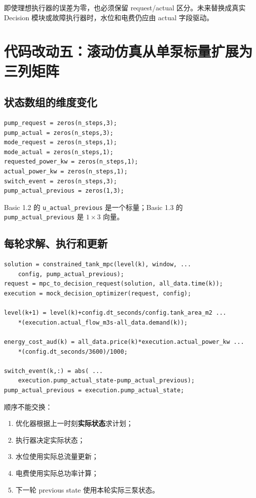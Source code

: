 \documentclass[UTF8,a4paper,11pt]{ctexart}
\newcommand{\code}[1]{\texttt{#1}}
\begin{document}
即使理想执行器的误差为零，也必须保留 request/actual 区分。未来替换成真实 Decision 模块或故障执行器时，水位和电费仍应由 actual 字段驱动。

\section{代码改动五：滚动仿真从单泵标量扩展为三列矩阵}

\subsection{状态数组的维度变化}

\begin{lstlisting}
pump_request = zeros(n_steps,3);
pump_actual = zeros(n_steps,3);
mode_request = zeros(n_steps,1);
mode_actual = zeros(n_steps,1);
requested_power_kw = zeros(n_steps,1);
actual_power_kw = zeros(n_steps,1);
switch_event = zeros(n_steps,3);
pump_actual_previous = zeros(1,3);
\end{lstlisting}

Basic 1.2 的 \code{u\_actual\_previous} 是一个标量；Basic 1.3 的 \code{pump\_actual\_previous} 是 $1\times3$ 向量。

\subsection{每轮求解、执行和更新}

\begin{lstlisting}[caption={Basic 1.3 闭环中最关键的执行顺序}]
solution = constrained_tank_mpc(level(k), window, ...
    config, pump_actual_previous);
request = mpc_to_decision_request(solution, all_data.time(k));
execution = mock_decision_optimizer(request, config);

level(k+1) = level(k)+config.dt_seconds/config.tank_area_m2 ...
    *(execution.actual_flow_m3s-all_data.demand(k));

energy_cost_aud(k) = all_data.price(k)*execution.actual_power_kw ...
    *(config.dt_seconds/3600)/1000;

switch_event(k,:) = abs( ...
    execution.pump_actual_state-pump_actual_previous);
pump_actual_previous = execution.pump_actual_state;
\end{lstlisting}

顺序不能交换：

\begin{enumerate}
  \item 优化器根据上一时刻\textbf{实际状态}求计划；
  \item 执行器决定实际状态；
  \item 水位使用实际总流量更新；
  \item 电费使用实际总功率计算；
  \item 下一轮 previous state 使用本轮实际三泵状态。
\end{enumerate}
\end{document}
